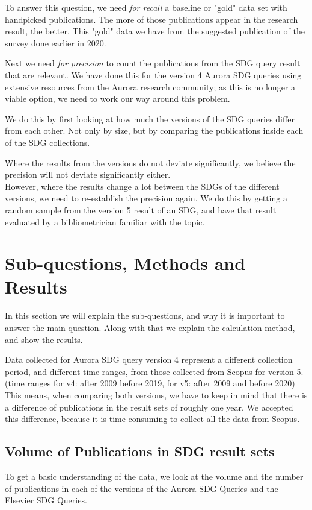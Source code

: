 \documentclass{article}
\begin{document}
To answer this question, we need \emph{for recall} a baseline or "gold" data set with handpicked publications. The more of those publications appear in the research result, the better. This "gold" data we have from the suggested publication of the survey done earlier in 2020.\cite{vanderfeesten_survey_2020}

Next we need \emph{for precision} to count the publications from the SDG query result that are relevant. We have done this for the version 4 Aurora SDG queries using extensive resources from the Aurora research community; as this is no longer a viable option, we need to work our way around this problem.

We do this by first looking at how much the versions of the SDG queries differ from each other. Not only by size, but by comparing the publications inside each of the SDG collections.

Where the results from the versions do not deviate significantly, we believe the precision will not deviate significantly either. \\
However, where the results change a lot between the SDGs of the different versions, we need to re-establish the precision again. We do this by getting a random sample from the version 5 result of an SDG, and have that result evaluated by a bibliometrician familiar with the topic.

\section{Sub-questions, Methods and Results}
In this section we will explain the sub-questions, and why it is important to answer the main question. Along with that we explain the calculation method, and show the results.

Data collected for Aurora SDG query version 4 represent a different collection period, and different time ranges, from those collected from Scopus for version 5. (time ranges for v4: after 2009 before 2019, for v5: after 2009 and before 2020) This means, when comparing both versions, we have to keep in mind that there is a difference of publications in the result sets of roughly one year. We accepted this difference, because it is time consuming to collect all the data from Scopus. 

\subsection{Volume of Publications in SDG result sets}
To get a basic understanding of the data, we look at the volume and the number of publications in each of the versions of the Aurora SDG Queries and the Elsevier SDG Queries.
\end{document}
